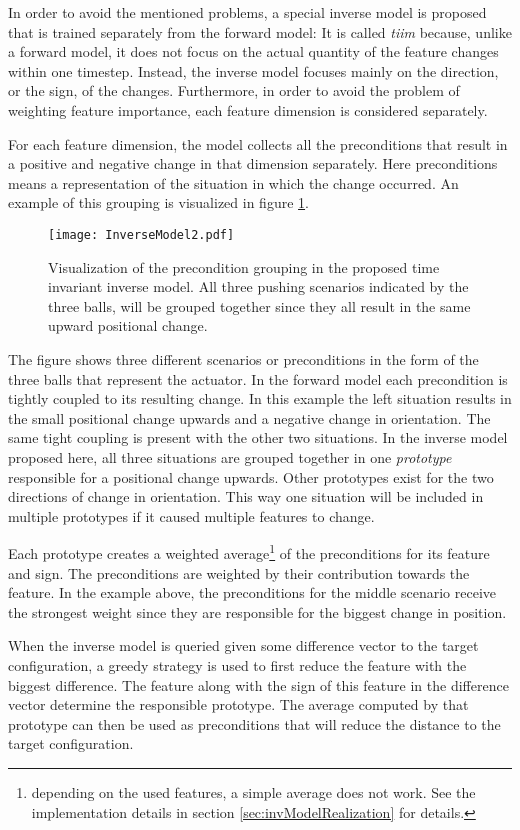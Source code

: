 In order to avoid the mentioned problems, a special inverse model is proposed that is trained separately from the forward model:
It is called \textit{\gls{tiim}} because, unlike a forward model, it does not focus on the actual quantity of the feature changes within one timestep. Instead, the inverse model focuses mainly on the direction, or the sign, of the changes. Furthermore, in order to avoid the problem of weighting feature importance, each feature dimension is considered separately. 

For each feature dimension, the model collects all the preconditions that result in a positive and negative change in that dimension separately. Here preconditions means a representation of the situation in which the change occurred.  
An example of this grouping is visualized in figure \ref{fig:InverseModel}. 

\begin{figure}
	\centering
	\texttt{[image: InverseModel2.pdf]}
	\caption{Visualization of the precondition grouping in the proposed time invariant inverse model. All three pushing scenarios indicated by the three balls, will be grouped together since they all result in the same upward positional change.}
	\label{fig:InverseModel}
\end{figure}

The figure shows three different scenarios or preconditions in the form of the three balls that represent the actuator. In the forward model each precondition is tightly coupled to its resulting change. In this example the left situation results in the small positional change upwards and a negative change in orientation. The same tight coupling is present with the other two situations. In the inverse model proposed here, all three situations are grouped together in one \textit{prototype} responsible for a positional change upwards. Other prototypes exist for the two directions of change in orientation. This way one situation will be included in multiple prototypes if it caused multiple features to change.

Each prototype creates a weighted average\footnote{depending on the used features, a simple average does not work. See the implementation details in section \ref{sec:invModelRealization} for details.} of the preconditions for its feature and sign. The preconditions are weighted by their contribution towards the feature. In the example above, the preconditions for the middle scenario receive the strongest weight since they are responsible for the biggest change in position. 

When the inverse model is queried given some difference vector to the target configuration, a greedy strategy is used to first reduce the feature with the biggest difference. 
The feature along with the sign of this feature in the difference vector determine the responsible prototype. The average computed by that prototype can then be used as preconditions that will reduce the distance to the target configuration.



	
